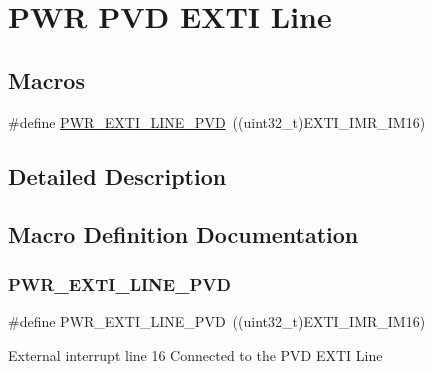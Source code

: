 \hypertarget{group___p_w_r___p_v_d___e_x_t_i___line}{}\section{P\+WR P\+VD E\+X\+TI Line}
\label{group___p_w_r___p_v_d___e_x_t_i___line}
\subsection*{Macros}
\begin{DoxyCompactItemize}
\item 
\#define \mbox{\hyperlink{group___p_w_r___p_v_d___e_x_t_i___line_ga43a49255649e03d2d2b6b12c5c379d2b}{P\+W\+R\+\_\+\+E\+X\+T\+I\+\_\+\+L\+I\+N\+E\+\_\+\+P\+VD}}~((uint32\+\_\+t)E\+X\+T\+I\+\_\+\+I\+M\+R\+\_\+\+I\+M16)
\end{DoxyCompactItemize}


\subsection{Detailed Description}


\subsection{Macro Definition Documentation}
\mbox{\label{group___p_w_r___p_v_d___e_x_t_i___line_ga43a49255649e03d2d2b6b12c5c379d2b}} 
\subsubsection{\texorpdfstring{PWR\_EXTI\_LINE\_PVD}{PWR\_EXTI\_LINE\_PVD}}
{\footnotesize\ttfamily \#define P\+W\+R\+\_\+\+E\+X\+T\+I\+\_\+\+L\+I\+N\+E\+\_\+\+P\+VD~((uint32\+\_\+t)E\+X\+T\+I\+\_\+\+I\+M\+R\+\_\+\+I\+M16)}

External interrupt line 16 Connected to the P\+VD E\+X\+TI Line 